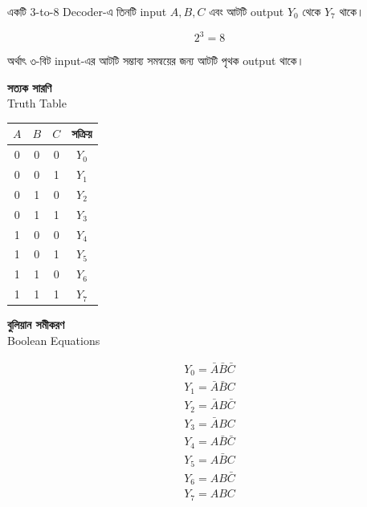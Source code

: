 একটি \textenglish{3-to-8 Decoder}-এ তিনটি
\textenglish{input} \(A,B,C\) এবং আটটি
\textenglish{output} \(Y_0\) থেকে \(Y_7\) থাকে।

\[
2^3=8
\]

অর্থাৎ ৩-বিট \textenglish{input}-এর আটটি সম্ভাব্য সমন্বয়ের জন্য
আটটি পৃথক \textenglish{output} থাকে।


\par\begingroup


\begin{minipage}[t]{0.25\textwidth}
\centering

\textbf{সত্যক সারণি}\\[-1mm]
{\footnotesize \textenglish{Truth Table}}

\vspace{4mm}

{\renewcommand{\arraystretch}{1.24}

\begin{tabular}{|c|c|c|c|}
\hline
\rowcolor{ICTLightBlue}
\(A\) & \(B\) & \(C\) & \textbf{সক্রিয়} \\
\hline
0 & 0 & 0 & \(Y_0\) \\ \hline
0 & 0 & 1 & \(Y_1\) \\ \hline
0 & 1 & 0 & \(Y_2\) \\ \hline
0 & 1 & 1 & \(Y_3\) \\ \hline
1 & 0 & 0 & \(Y_4\) \\ \hline
1 & 0 & 1 & \(Y_5\) \\ \hline
1 & 1 & 0 & \(Y_6\) \\ \hline
1 & 1 & 1 & \(Y_7\) \\ \hline
\end{tabular}

}

\end{minipage}
\hfill
\begin{minipage}[t]{0.25\textwidth}
\centering

\textbf{বুলিয়ান সমীকরণ}\\[-1mm]
{\footnotesize \textenglish{Boolean Equations}}

\vspace{2mm}

\[
\begin{array}{c}
Y_0=\bar A\bar B\bar C\\[1.5mm]
Y_1=\bar A\bar B C\\[1.5mm]
Y_2=\bar A B\bar C\\[1.5mm]
Y_3=\bar A BC\\[1.5mm]
Y_4=A\bar B\bar C\\[1.5mm]
Y_5=A\bar B C\\[1.5mm]
Y_6=AB\bar C\\[1.5mm]
Y_7=ABC
\end{array}
\]

\end{minipage}
